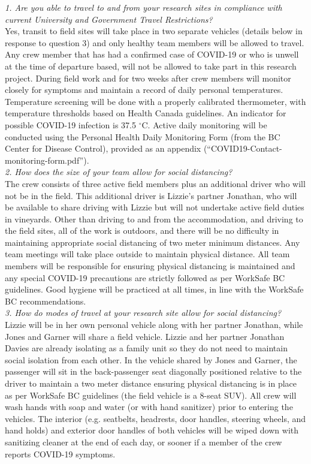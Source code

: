\documentclass[11pt,letter]{article}
\begin{document}
\emph{1. Are you able to travel to and from your research sites in compliance with current University and Government Travel Restrictions?}\\
Yes, transit to field sites will take place in two separate vehicles (details below in response to question 3) and only healthy team members will be allowed to travel. Any crew member that has had a confirmed case of COVID-19 or who is unwell at the time of departure based, will not be allowed to take part in this research project. During field work and for two weeks after crew members will monitor closely for symptoms and maintain a record of daily personal temperatures. Temperature screening will be done with a properly calibrated thermometer, with temperature thresholds based on Health Canada guidelines. An indicator for possible COVID-19 infection is 37.5 $^{\circ}$C. Active daily monitoring will be conducted using the Personal Health Daily Monitoring Form (from the BC Center for Disease Control), provided as an appendix (``COVID19-Contact-monitoring-form.pdf''). \\
   
\emph{2. How does the size of your team allow for social distancing?}\\
The crew consists of three active field members plus an additional driver who will not be in the field. This additional driver is Lizzie's partner Jonathan, who will be available to share driving with Lizzie but will not undertake active field duties in vineyards. Other than driving to and from the accommodation, and driving to the field sites, all of the work is outdoors, and there will be no difficulty in maintaining appropriate social distancing of two meter minimum distances. Any team meetings will take place outside to maintain physical distance. All team members will be responsible for ensuring physical distancing is maintained and any special COVID-19 precautions are strictly followed as per WorkSafe BC guidelines. Good hygiene will be practiced at all times, in line with the WorkSafe BC recommendations. \\

\emph{3. How do modes of travel at your research site allow for social distancing?}\\
Lizzie will be in her own personal vehicle along with her partner Jonathan, while Jones and Garner will share a field vehicle. Lizzie and her partner Jonathan Davies are already isolating as a family unit so they do not need to maintain social isolation from each other. In the vehicle shared by Jones and Garner, the passenger will sit in the back-passenger seat diagonally positioned relative to the driver to maintain a two meter distance ensuring physical distancing is in place as per WorkSafe BC guidelines (the field vehicle is a 8-seat SUV). All crew will wash hands with soap and water (or with hand sanitizer) prior to entering the vehicles. The interior (e.g. seatbelts, headrests, door handles, steering wheels, and hand holds) and exterior door handles of both vehicles will be wiped down with sanitizing cleaner at the end of each day, or sooner if a member of the crew reports COVID-19 symptoms.\\  
\end{document}
